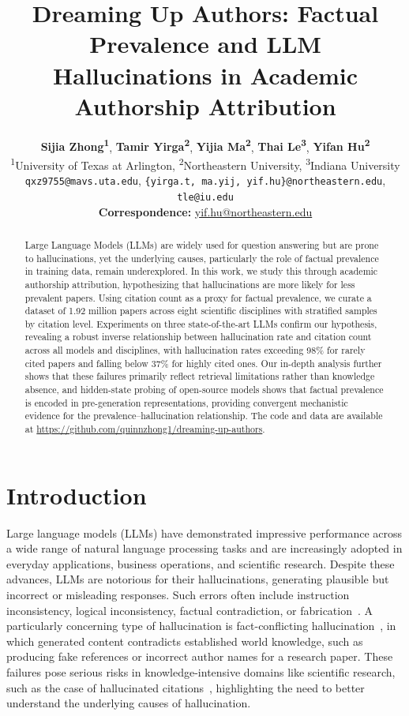 \documentclass[11pt]{article}
\title{
Dreaming Up Authors: Factual Prevalence and LLM Hallucinations in Academic Authorship Attribution
}
\author{
  \textbf{Sijia Zhong\textsuperscript{1}},
  \textbf{Tamir Yirga\textsuperscript{2}},
  \textbf{Yijia Ma\textsuperscript{2}},
  \textbf{Thai Le\textsuperscript{3}},
  \textbf{Yifan Hu\textsuperscript{2}}
\\
  \textsuperscript{1}University of Texas at Arlington,
  \textsuperscript{2}Northeastern University,
  \textsuperscript{3}Indiana University
\\
  \small{
    \texttt{qxz9755@mavs.uta.edu},
    \texttt{\{yirga.t, ma.yij, yif.hu\}@northeastern.edu},
    \texttt{tle@iu.edu}
  }
\\
  \small{
    \textbf{Correspondence:} \href{mailto:yif.hu@northeastern.edu}{yif.hu@northeastern.edu}
  }
}
\begin{document}
\maketitle
\begin{abstract}

Large Language Models (LLMs) are widely used for question answering but are prone to hallucinations, yet the underlying causes, particularly the role of factual prevalence in training data, remain underexplored. In this work, we study this through academic authorship attribution, hypothesizing that hallucinations are more likely for less prevalent papers. Using citation count as a proxy for factual prevalence, we curate a dataset of 1.92 million papers across eight scientific disciplines with stratified samples by citation level. Experiments on three state-of-the-art LLMs confirm our hypothesis, revealing a robust inverse relationship between hallucination rate and citation count across all models and disciplines, with hallucination rates exceeding 98\% for rarely cited papers and falling below 37\% for highly cited ones. Our in-depth analysis further shows that these failures primarily reflect retrieval limitations rather than knowledge absence, and hidden-state probing of open-source models shows that factual prevalence is encoded in pre-generation representations, providing convergent mechanistic evidence for the prevalence--hallucination relationship. The code and data are available at \url{https://github.com/quinnzhong1/dreaming-up-authors}.

\end{abstract}

\section{Introduction}

Large language models (LLMs) have demonstrated impressive performance across a wide range of natural language processing tasks and are increasingly adopted in everyday applications, business operations, and scientific research.
Despite these advances, LLMs are notorious for their hallucinations, generating plausible but incorrect or misleading responses. Such errors often include instruction inconsistency, logical inconsistency, factual contradiction, or fabrication~\cite{Huang_2025_hallucination_survey}.
A particularly concerning type of hallucination is fact-conflicting hallucination~\citep{zhang2025sirenssongaiocean}, in which generated content contradicts established world knowledge, such as producing fake references or incorrect author names for a research paper. These failures pose serious risks in knowledge-intensive domains like scientific research, such as the case of hallucinated citations~\cite{naddaf2026hallucinated}, highlighting the need to better understand the underlying causes of hallucination.
\end{document}
